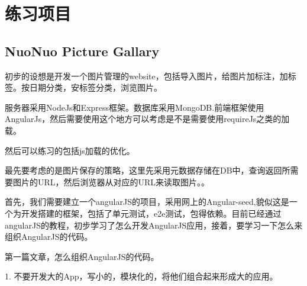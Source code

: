 \chapter{练习项目}

  \section{NuoNuo Picture Gallary}

  初步的设想是开发一个图片管理的website，包括导入图片，给图片加标注，加标签。按日期分类，安标签分类，浏览图片。

  服务器采用NodeJs和Express框架。数据库采用MongoDB.前端框架使用AngularJs，然后需要使用这个地方可以考虑是不是需要使用requireJs之类的加载。

  然后可以练习的包括js加载的优化。

  最先要考虑的是图片保存的策略，这里先采用元数据存储在DB中，查询返回所需要图片的URL，然后浏览器从对应的URL来读取图片。。

  首先，我们需要建立一个angularJS的项目，采用网上的Angular-seed,貌似这是一个为开发搭建的框架，包括了单元测试，e2e测试，包得依赖。目前已经通过angularJS的教程，初步学习了怎么开发AngularJS应用，接着，要学习一下怎么来组织AngularJS的代码。


  第一篇文章，怎么组织AngularJS的代码。

  1. 不要开发大的App，写小的，模块化的，将他们组合起来形成大的应用。

